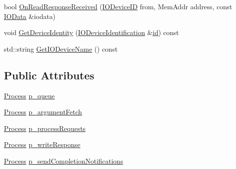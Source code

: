 \begin{DoxyCompactItemize}
\item 
bool \hyperlink{class_simulator_1_1_r_p_c_interface_ade9d048022f35e3a7a03d36f42ffab11}{On\+Read\+Response\+Received} (\hyperlink{namespace_simulator_a3493d987c866ad6b8aaa704c42502db0}{I\+O\+Device\+I\+D} from, Mem\+Addr address, const \hyperlink{struct_simulator_1_1_i_o_data}{I\+O\+Data} \&iodata)
\item 
void \hyperlink{class_simulator_1_1_r_p_c_interface_ac2e9b8ebf7f37e984c5409f88f29193b}{Get\+Device\+Identity} (\hyperlink{struct_simulator_1_1_i_o_device_identification}{I\+O\+Device\+Identification} \&\hyperlink{mtconf_8c_aa3185401f04d30bd505daebf48c39cc5}{id}) const 
\item 
std\+::string \hyperlink{class_simulator_1_1_r_p_c_interface_abb306b9b717c83519a828a7ae5270ceb}{Get\+I\+O\+Device\+Name} () const 
\end{DoxyCompactItemize}
\subsection*{Public Attributes}
\begin{DoxyCompactItemize}
\item 
\hyperlink{class_simulator_1_1_process}{Process} \hyperlink{class_simulator_1_1_r_p_c_interface_aa494a0522ef64eea34e6f19df5fd440d}{p\+\_\+queue}
\item 
\hyperlink{class_simulator_1_1_process}{Process} \hyperlink{class_simulator_1_1_r_p_c_interface_a10feb8760457103276db81eb4eeda849}{p\+\_\+argument\+Fetch}
\item 
\hyperlink{class_simulator_1_1_process}{Process} \hyperlink{class_simulator_1_1_r_p_c_interface_a5939893eeb8f04cc81084e2739cb5899}{p\+\_\+process\+Requests}
\item 
\hyperlink{class_simulator_1_1_process}{Process} \hyperlink{class_simulator_1_1_r_p_c_interface_a30ee8b18387a9c7cec8a5becedb73f01}{p\+\_\+write\+Response}
\item 
\hyperlink{class_simulator_1_1_process}{Process} \hyperlink{class_simulator_1_1_r_p_c_interface_a60dbd5ba0a05311b93263be883a62c82}{p\+\_\+send\+Completion\+Notifications}
\end{DoxyCompactItemize}


